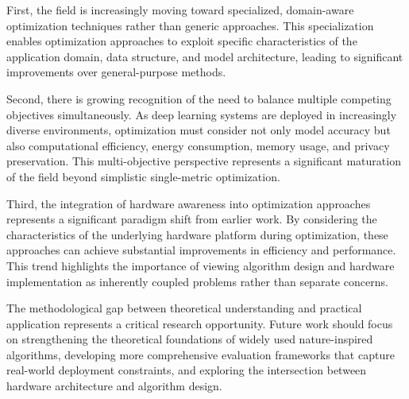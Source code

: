 \documentclass[acmsmall]{acmart}
\begin{document}
First, the field is increasingly moving toward specialized, domain-aware optimization techniques rather than generic approaches. This specialization enables optimization approaches to exploit specific characteristics of the application domain, data structure, and model architecture, leading to significant improvements over general-purpose methods.

Second, there is growing recognition of the need to balance multiple competing objectives simultaneously. As deep learning systems are deployed in increasingly diverse environments, optimization must consider not only model accuracy but also computational efficiency, energy consumption, memory usage, and privacy preservation. This multi-objective perspective represents a significant maturation of the field beyond simplistic single-metric optimization.

Third, the integration of hardware awareness into optimization approaches represents a significant paradigm shift from earlier work. By considering the characteristics of the underlying hardware platform during optimization, these approaches can achieve substantial improvements in efficiency and performance. This trend highlights the importance of viewing algorithm design and hardware implementation as inherently coupled problems rather than separate concerns.

The methodological gap between theoretical understanding and practical application represents a critical research opportunity. Future work should focus on strengthening the theoretical foundations of widely used nature-inspired algorithms, developing more comprehensive evaluation frameworks that capture real-world deployment constraints, and exploring the intersection between hardware architecture and algorithm design.



\end{document}
